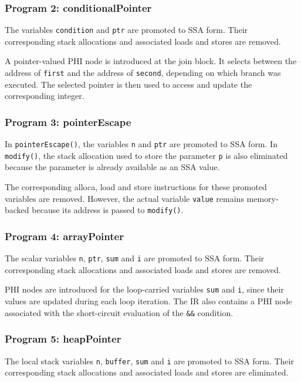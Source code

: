 \documentclass{article}
\begin{document}
\subsubsection{Program 2: conditionalPointer}

The variables \texttt{condition} and \texttt{ptr} are promoted to SSA
form. Their corresponding stack allocations and associated loads and
stores are removed.

A pointer-valued PHI node is introduced at the join block. It selects
between the address of \texttt{first} and the address of
\texttt{second}, depending on which branch was executed. The selected
pointer is then used to access and update the corresponding integer.

\subsubsection{Program 3: pointerEscape}

In \texttt{pointerEscape()}, the variables \texttt{n} and \texttt{ptr}
are promoted to SSA form. In \texttt{modify()}, the stack allocation
used to store the parameter \texttt{p} is also eliminated because the
parameter is already available as an SSA value.

The corresponding alloca, load and store instructions for these promoted
variables are removed. However, the actual variable \texttt{value}
remains memory-backed because its address is passed to
\texttt{modify()}.

\subsubsection{Program 4: arrayPointer}

The scalar variables \texttt{n}, \texttt{ptr}, \texttt{sum} and
\texttt{i} are promoted to SSA form. Their corresponding stack
allocations and associated loads and stores are removed.

PHI nodes are introduced for the loop-carried variables \texttt{sum} and
\texttt{i}, since their values are updated during each loop iteration.
The IR also contains a PHI node associated with the short-circuit
evaluation of the \texttt{\&\&} condition.

\subsubsection{Program 5: heapPointer}

The local stack variables \texttt{n}, \texttt{buffer}, \texttt{sum} and
\texttt{i} are promoted to SSA form. Their corresponding stack
allocations and associated loads and stores are eliminated.
\end{document}

